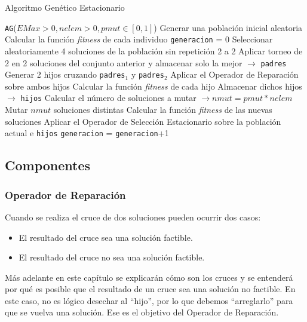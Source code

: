 \begin{algorithm}
\caption{Algoritmo Genético Estacionario}\label{alg:AGE}
\begin{algorithmic}[1]
\Procedure \texttt{AG}($EMax > 0, nelem > 0, pmut \in [0,1]$)
\State Generar una población inicial aleatoria
\State Calcular la función \textit{fitness} de cada individuo
\State \texttt{generacion} = 0
	\State Seleccionar aleatoriamente 4 soluciones de la población sin repetición 2 a 2
	\State Aplicar torneo de 2 en 2 soluciones del conjunto anterior y almacenar solo la mejor $\xrightarrow{}{}$ \texttt{padres}
	\State Generar 2 hijos cruzando \texttt{padres$_1$} y \texttt{padres$_2$}
	\State Aplicar el Operador de Reparación sobre ambos hijos
	\State Calcular la función \textit{fitness} de cada hijo
	\State Almacenar dichos hijos $\xrightarrow{}{}$ \texttt{hijos}
	\State Calcular el número de soluciones a mutar $\xrightarrow{}{} nmut = pmut*nelem$
	\State Mutar $nmut$ soluciones distintas
	\State Calcular la función \textit{fitness} de las nuevas soluciones
	\State Aplicar el Operador de Selección Estacionario sobre la población actual e \texttt{hijos}
	\State \texttt{generacion} = \texttt{generacion}+1
\EndWhile
\EndProcedure
\end{algorithmic}
\end{algorithm}

\subsection{Componentes}

\subsubsection{Operador de Reparación}

Cuando se realiza el cruce de dos soluciones pueden ocurrir dos casos:
\begin{itemize}
	\item El resultado del cruce sea una solución factible.
	\item El resultado del cruce no sea una solución factible.
\end{itemize}

Más adelante en este capítulo se explicarán cómo son los cruces y se entenderá por qué es posible que el resultado de un cruce sea una solución no factible. 
En este caso, no es lógico desechar al ``hijo'', por lo que debemos ``arreglarlo'' para que se vuelva una solución. 
Ese es el objetivo del Operador de Reparación. 

